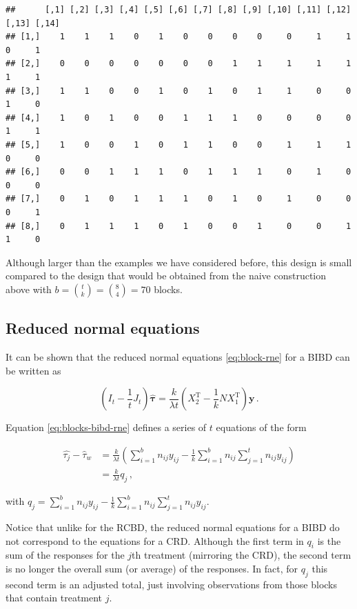 \documentclass[
]{book}
\theoremstyle{definition}
\theoremstyle{definition}
\theoremstyle{definition}
\theoremstyle{definition}
\theoremstyle{remark}
\begin{document}
\begin{verbatim}
##      [,1] [,2] [,3] [,4] [,5] [,6] [,7] [,8] [,9] [,10] [,11] [,12] [,13] [,14]
## [1,]    1    1    1    0    1    0    0    0    0     0     1     1     0     1
## [2,]    0    0    0    0    0    0    0    1    1     1     1     1     1     1
## [3,]    1    1    0    0    1    0    1    0    1     1     0     0     1     0
## [4,]    1    0    1    0    0    1    1    1    0     0     0     0     1     1
## [5,]    1    0    0    1    0    1    1    0    0     1     1     1     0     0
## [6,]    0    0    1    1    1    0    1    1    1     0     1     0     0     0
## [7,]    0    1    0    1    1    1    0    1    0     1     0     0     0     1
## [8,]    0    1    1    1    0    1    0    0    1     0     0     1     1     0
\end{verbatim}

Although larger than the examples we have considered before, this design is small compared to the design that would be obtained from the naive construction above with \(b = {t \choose k} = {8 \choose 4} = 70\) blocks.

\hypertarget{reduced-normal-equations}{%
\subsection{Reduced normal equations}\label{reduced-normal-equations}}

It can be shown that the reduced normal equations \eqref{eq:block-rne} for a BIBD can be written as

\begin{equation}
\left(I_t - \frac{1}{t}J_t\right)\hat{\boldsymbol{\tau}} = \frac{k}{\lambda t}\left(X_2^{\mathrm{T}} - \frac{1}{k}NX_1^{\mathrm{T}}\right)\boldsymbol{y}\,.
\label{eq:blocks-bibd-rne}
\end{equation}

Equation \eqref{eq:blocks-bibd-rne} defines a series of \(t\) equations of the form

\begin{align*}
\hat{\tau_j} - \hat{\tau}_w & = \frac{k}{\lambda t}\left(\sum_{i = 1}^b n_{ij}y_{ij} - \frac{1}{k}\sum_{i=1}^bn_{ij}\sum_{j=1}^tn_{ij}y_{ij}\right) \\
& = \frac{k}{\lambda t} q_j\,,
\end{align*}

with \(q_j = \sum_{i = 1}^b n_{ij}y_{ij} - \frac{1}{k}\sum_{i=1}^bn_{ij}\sum_{j=1}^tn_{ij}y_{ij}\).

Notice that unlike for the RCBD, the reduced normal equations for a BIBD do not correspond to the equations for a CRD. Although the first term in \(q_i\) is the sum of the responses for the \(j\)th treatment (mirroring the CRD), the second term is no longer the overall sum (or average) of the responses. In fact, for \(q_j\) this second term is an adjusted total, just involving observations from those blocks that contain treatment \(j\).
\end{document}
